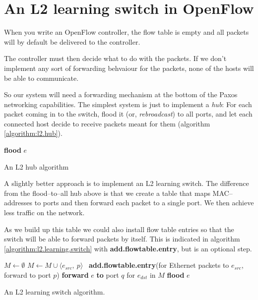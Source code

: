 \section{An L2 learning switch in OpenFlow}

When you write an OpenFlow controller, the flow table is empty and all
packets will by default be delivered to the controller.

The controller must then decide what to do with the packets.  If we don't
implement any sort of forwarding behvaiour for the packets, none of the
hosts will be able to communicate.

So our system will need a forwarding mechanism at the bottom of the Paxos
networking capabilities.  The simplest system is just to implement a
\textit{hub}:  For each packet coming in to the switch, flood it (or,
\textit{rebroadcast}) to all ports, and let each connected host decide 
to receive packets meant for them (algorithm \ref{algorithm:l2.hub}).

\begin{algorithm}
  \begin{algorithmic}
      \State \textbf{flood} $e$ 
    \EndOn
  \end{algorithmic}
  \caption{An L2 hub algorithm}
  \label{algorithm:l2.hub}
\end{algorithm}

A slightly better approach is to implement an \ac{L2} learning switch.
The difference from the flood--to--all hub above is that we create a table
that maps MAC--addresses to ports and then forward each packet to a single
port.  We then achieve less traffic on the network.

As we build up this table we could also install flow table entries so that the
switch will be able to forward packets by itself.  This is indicated in
algorithm \vref{algorithm:l2.learning.switch} with
\textbf{add.flowtable.entry}, but is an optional step.

\begin{algorithm}
  \begin{algorithmic}
    \State $M \gets \emptyset$
    \State
      \State $M \gets M \cup \langle e_{src},\ p \rangle$ 
      \State
      \State \textbf{add.flowtable.entry}(for Ethernet packets to
        $e_{src}$, forward to port $p$)
      \State
        \State \textbf{forward} $e$ \textbf{to} port $q$ for $e_{dst}$ in $M$
      \Else
        \State \textbf{flood} $e$ 
      \EndIf
    \EndOn
  \end{algorithmic}
  \caption{An L2 learning switch algorithm.}
  \label{algorithm:l2.learning.switch}
\end{algorithm}

